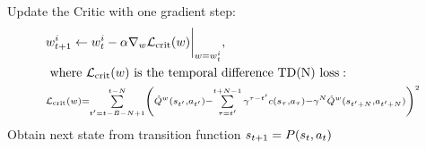 \documentclass[12pt,twoside]{../../mitthesis}
\begin{document}
\begin{algorithm}
\begin{algorithmic}[1]
$$            $$
            \STATE Update the Critic with one gradient step:
            \begin{equation}
                \label{eqn_critic_update}
                \begin{aligned}
                &w_{t+1}^i \gets w^i_{t} - \alpha \nabla_w\mathcal L_{{\text{crit}}}(w)\bigg\rvert_{w = w^i_{t}}, \\
                &\text{ where } \mathcal L_{{\text{crit}}}(w) \text{ is the temporal difference TD(N) loss}: \\
                &\scriptstyle {\mathcal L_{{\text{crit}}}(w) = \sum\limits_{t'=t-B-N+1}^{t - N}\left(\hat Q^w(s_{t'}, a_{t'}) - \sum\limits_{\tau=t'}^{t + N - 1} \gamma^{\tau-t'}c(s_{\tau}, a_{\tau}) - \gamma^{N}\hat Q^w(s_{t' + N}, a_{t' + N})\right)^2}
                \end{aligned}
            \end{equation}
            \STATE Obtain next state from transition function $s_{t+1} = P(s_t, a_t)$
        \ENDFOR
    \ENDFOR
    \end{algorithmic}
\end{algorithm}
\end{document}
